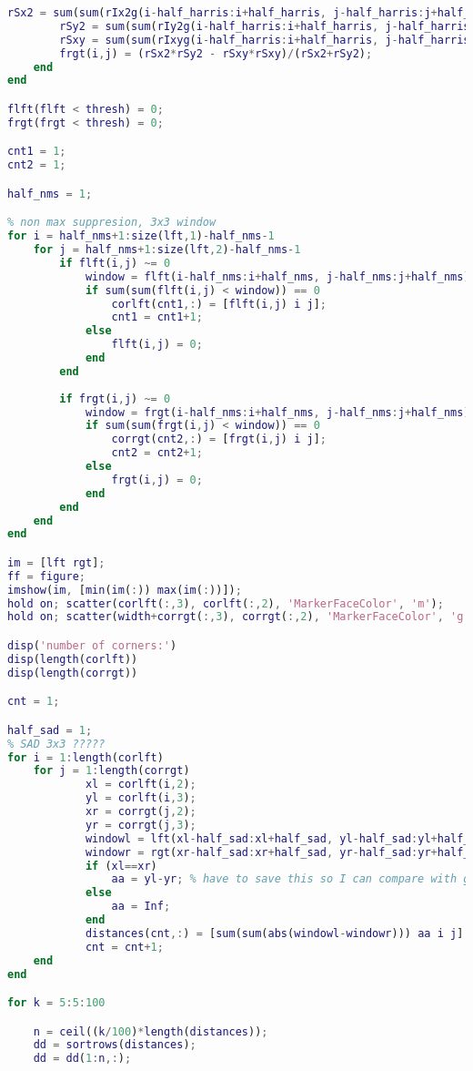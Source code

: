 \documentclass{article}
\begin{document}
\begin{lstlisting}[language=Matlab]
        rSx2 = sum(sum(rIx2g(i-half_harris:i+half_harris, j-half_harris:j+half_harris)));
        rSy2 = sum(sum(rIy2g(i-half_harris:i+half_harris, j-half_harris:j+half_harris))); 
        rSxy = sum(sum(rIxyg(i-half_harris:i+half_harris, j-half_harris:j+half_harris)));
        frgt(i,j) = (rSx2*rSy2 - rSxy*rSxy)/(rSx2+rSy2);   
    end
end

flft(flft < thresh) = 0;
frgt(frgt < thresh) = 0;

cnt1 = 1;
cnt2 = 1;

half_nms = 1;

% non max suppresion, 3x3 window
for i = half_nms+1:size(lft,1)-half_nms-1
    for j = half_nms+1:size(lft,2)-half_nms-1
        if flft(i,j) ~= 0
            window = flft(i-half_nms:i+half_nms, j-half_nms:j+half_nms);
            if sum(sum(flft(i,j) < window)) == 0
                corlft(cnt1,:) = [flft(i,j) i j];
                cnt1 = cnt1+1;
            else
                flft(i,j) = 0;
            end
        end
        
        if frgt(i,j) ~= 0
            window = frgt(i-half_nms:i+half_nms, j-half_nms:j+half_nms);
            if sum(sum(frgt(i,j) < window)) == 0
                corrgt(cnt2,:) = [frgt(i,j) i j];
                cnt2 = cnt2+1;
            else
                frgt(i,j) = 0;
            end
        end
    end
end

im = [lft rgt];
ff = figure;
imshow(im, [min(im(:)) max(im(:))]);
hold on; scatter(corlft(:,3), corlft(:,2), 'MarkerFaceColor', 'm');
hold on; scatter(width+corrgt(:,3), corrgt(:,2), 'MarkerFaceColor', 'g');

disp('number of corners:')
disp(length(corlft))
disp(length(corrgt))

cnt = 1;

half_sad = 1;
% SAD 3x3 ?????
for i = 1:length(corlft)
    for j = 1:length(corrgt)
            xl = corlft(i,2);
            yl = corlft(i,3);
            xr = corrgt(j,2);
            yr = corrgt(j,3);
            windowl = lft(xl-half_sad:xl+half_sad, yl-half_sad:yl+half_sad);
            windowr = rgt(xr-half_sad:xr+half_sad, yr-half_sad:yr+half_sad);
            if (xl==xr)
                aa = yl-yr; % have to save this so I can compare with groundtruth
            else
                aa = Inf;
            end
            distances(cnt,:) = [sum(sum(abs(windowl-windowr))) aa i j];
            cnt = cnt+1;
    end
end

for k = 5:5:100

    n = ceil((k/100)*length(distances));
    dd = sortrows(distances);
    dd = dd(1:n,:);



\end{lstlisting}
\end{document}
